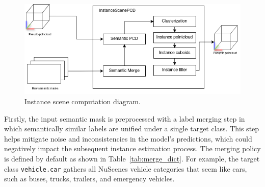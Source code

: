 \begin{figure}[!ht]
    \centering
    \includegraphics[width=0.6\linewidth]{images/methodology/instance_scene_flow_diagram.png}
    \caption{Instance scene computation diagram.}
    \label{fig:instance_scene_diagram}
\end{figure}

Firstly, the input semantic mask is preprocessed with a label merging step in which semantically similar labels are unified under a single target class. This step helps mitigate noise and inconsistencies in the model's predictions, which could negatively impact the subsequent instance estimation process. The merging policy is defined by default as shown in Table~\ref{tab:merge_dict}. For example, the target class \texttt{vehicle.car} gathers all NuScenes vehicle categories that seem like cars, such as buses, trucks, trailers, and emergency vehicles.

